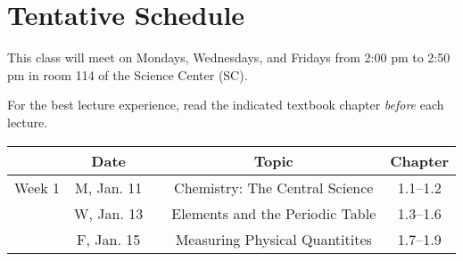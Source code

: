 \documentclass[12pt, letterpaper]{article}
\begin{document}
\section*{Tentative Schedule}
This class will meet on Mondays, Wednesdays, and Fridays from 2:00 pm to 2:50 pm in room 114 of the Science Center (SC).

\noindent For the best lecture experience, read the indicated textbook chapter \emph{before} each lecture.

\noindent
\begin{tabular}{rcccc}
	& Date && Topic & Chapter\\
	\midrule
	Week 1 & M, Jan. 11&& Chemistry: The Central Science & 1.1--1.2\\
	& W, Jan. 13&& Elements and the Periodic Table & 1.3--1.6\\
	& F, Jan. 15&& Measuring Physical Quantitites & 1.7--1.9\\
\end{tabular}
	
\end{document}
